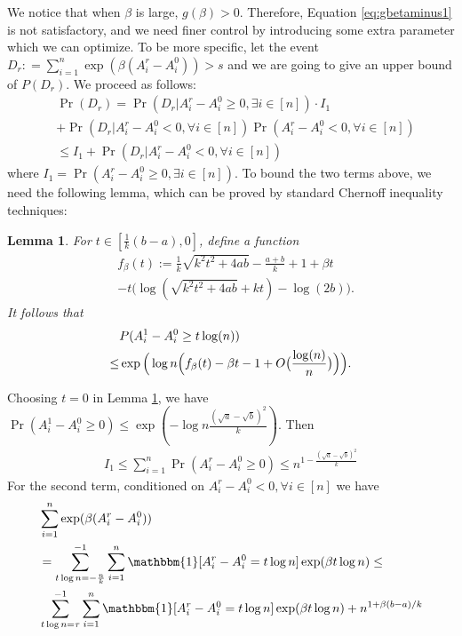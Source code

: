 \documentclass[conference]{IEEEtran}
\newtheorem{lemma}{Lemma}
\begin{document}
	We notice that when $\beta$ is large, $g(\beta) > 0$. Therefore, Equation \eqref{eq:gbetaminus1} is not satisfactory, and
	we need finer control by introducing some extra parameter which we can optimize. To be more specific, let
	the event $D_r : = \sum_{i=1}^n\exp ( \beta(A^r_i-A^0_i)) > s$
	and we are going to give an upper bound of $P(D_r)$. We proceed as follows: 
	\begin{align*}
	&\Pr(D_r) = 
	\Pr(D_r| A_i^r - A_i^0 \geq 0, \exists i\in [n])
	\cdot I_1 \\
	&+ \Pr(D_r | A_i^r - A_i^0  < 0, \forall i\in [n])
	\Pr(  A_i^r - A_i^0  < 0 , \forall i \in [n] ) \\
	& \leq I_1
	+ \Pr(D_r | A_i^r - A_i^0  < 0, \forall i\in [n])
	\end{align*}
	where $I_1 = \Pr( A_i^r - A_i^0 \geq 0, \exists i\in [n])$.
	To bound the two terms above, we need the following lemma, which can be proved by standard Chernoff inequality techniques:
	\begin{lemma}\label{lem:fb}
		For $t\in [\frac{1}{k}(b-a), 0]$,
		define a function
		\begin{align*}
		&f_{\beta}(t):=\frac{1}{k}\sqrt{k^2t^2+4ab} -\frac{a+b}{k} +1 +\beta t  \\
		&-t\big(\log(\sqrt{k^2t^2+4ab}+kt)-\log(2b) \big).
		\end{align*}
		It follows that
		\begin{align} \label{eq:upba}
		& P(A^1_i-A^0_i\ge t\log(n))  \notag\\
		\le &  \exp\Big(\log n \Big(f_{\beta}(t) -\beta t  - 1 + O\big(\frac{\log(n)}{n}\big) \Big)\Big) .
		\end{align}
	\end{lemma}
	Choosing $t=0$ in Lemma \ref{lem:fb}, we have
	$\Pr(A^1_i-A^0_i\ge 0 ) \leq \exp(-\log n \frac{(\sqrt{a}-\sqrt{b})^2}{k})$.
	Then
	\begin{align*}
	I_1 \leq \sum_{i=1}^n \Pr( A_i^r - A_i^0 \geq 0) \leq n^{1-\frac{(\sqrt{a}-\sqrt{b})^2}{k}}
	\end{align*}
	For the second term,
	conditioned on $A_i^r - A_i^0  < 0, \forall i\in [n]$ we have
	\begin{align*}
	&\sum_{i=1}^n\exp ( \beta(A^r_i-A^0_i)) \\
	& = \sum_{t\log n =-\frac{n}{k}}^{-1}\sum_{i=1}^n \mathbbm{1}[A^r_i - A^0_i = t \log n] \exp ( \beta  t\log n)\leq \\ 
	&
	\sum_{t\log n =\tau}^{-1}\sum_{i=1}^n \mathbbm{1}[A^r_i - A^0_i = t \log n]\exp ( \beta  t\log n) + n^{1+\beta(b-a)/k}
	\end{align*}
\end{document}
